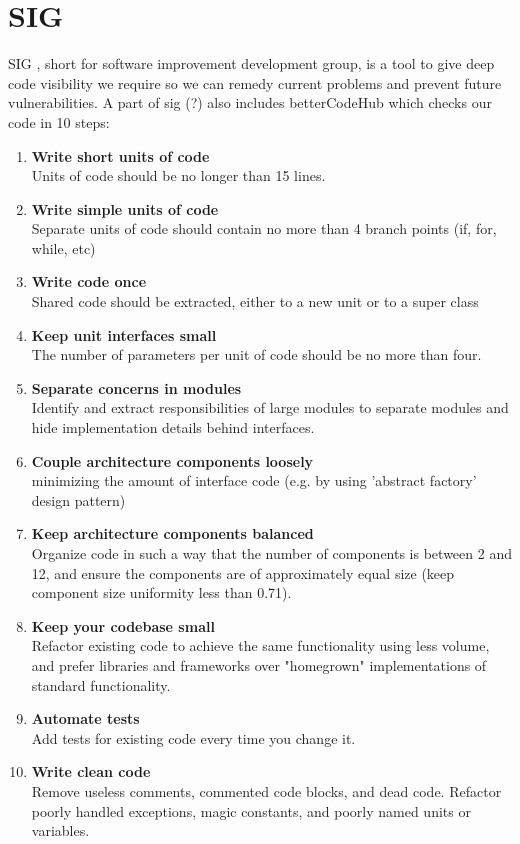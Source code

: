 \section{SIG}
SIG \cite{sig}, short for software improvement development group, is a tool to give deep code visibility we require so we can remedy current problems and prevent future vulnerabilities. A part of sig \todo{}(?) also includes betterCodeHub \cite{better_code_hub} which checks our code in 10 steps:
\begin{enumerate}
    \item \textbf {Write short units of code} \\
    Units of code should be no longer than 15 lines.
    \item \textbf {Write simple units of code} \\
    Separate units of code should contain no more than 4 branch points (if, for, while, etc)
    \item \textbf{Write code once} \\
    Shared code should be extracted, either to a new unit or to a super class
    \item \textbf{Keep unit interfaces small} \\
    The number of parameters per unit of code should be no more than four.
    \item \textbf{Separate concerns in modules} \\
    Identify and extract responsibilities of large modules to separate modules and hide implementation details behind interfaces.
    \item \textbf{Couple architecture components loosely} \\
    minimizing the amount of interface code (e.g. by using 'abstract factory' design pattern)
    \item \textbf{Keep architecture components balanced} \\
    Organize code in such a way that the number of components is between 2 and 12, and ensure the components are of approximately equal size (keep component size uniformity less than 0.71).
    \item \textbf{Keep your codebase small} \\
    Refactor existing code to achieve the same functionality using less volume, and prefer libraries and frameworks over "homegrown" implementations of standard functionality.
    \item \textbf{Automate tests} \\
    Add tests for existing code every time you change it.
    \item \textbf{Write clean code}\\
    Remove useless comments, commented code blocks, and dead code. Refactor poorly handled exceptions, magic constants, and poorly named units or variables.  
\end{enumerate}

\begin{comment}
- double city names
- city names with meaning (leiden)
- city/province names (utrecht / groningen / zeeland)
\end{comment}